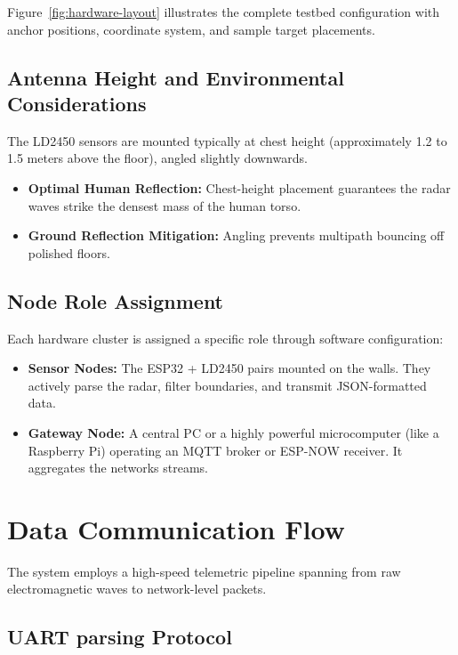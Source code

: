 Figure~\ref{fig:hardware-layout} illustrates the complete testbed configuration with anchor positions, coordinate system, and sample target placements.

\subsection{Antenna Height and Environmental Considerations}
\label{subsec:antenna-height}

The LD2450 sensors are mounted typically at chest height (approximately 1.2 to 1.5 meters above the floor), angled slightly downwards.
\begin{itemize}
    \item \textbf{Optimal Human Reflection:} Chest-height placement guarantees the radar waves strike the densest mass of the human torso.
    \item \textbf{Ground Reflection Mitigation:} Angling prevents multipath bouncing off polished floors.
\end{itemize}

\subsection{Node Role Assignment}
\label{subsec:node-roles}

Each hardware cluster is assigned a specific role through software configuration:

\begin{itemize}
    \item \textbf{Sensor Nodes:} The ESP32 + LD2450 pairs mounted on the walls. They actively parse the radar, filter boundaries, and transmit JSON-formatted data.
    \item \textbf{Gateway Node:} A central PC or a highly powerful microcomputer (like a Raspberry Pi) operating an MQTT broker or ESP-NOW receiver. It aggregates the networks streams.
\end{itemize}

\section{Data Communication Flow}
\label{sec:data-communication}

The system employs a high-speed telemetric pipeline spanning from raw electromagnetic waves to network-level packets.

\subsection{UART parsing Protocol}
\label{subsec:espnow-protocol}


